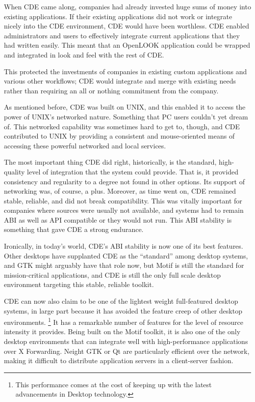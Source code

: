 When CDE came along, companies had already invested huge sums of money
into existing applications. If their existing applications did not work
or integrate nicely into the CDE environment, CDE would have been
worthless. CDE enabled administrators and users to effectively integrate
current applications that they had written easily. This meant that an
OpenLOOK application could be wrapped and integrated in look and feel
with the rest of CDE.

This protected the investments of companies in existing custom
applications and various other workflows; CDE would integrate and merge
with existing needs rather than requiring an all or nothing commitment
from the company.

As mentioned before, CDE was built on UNIX, and this enabled it to
access the power of UNIX's networked nature. Something that PC users
couldn't yet dream of. This networked capability was sometimes hard to
get to, though, and CDE contributed to UNIX by providing a consistent
and mouse-oriented means of accessing these powerful networked and local
services.


The most important thing CDE did right, historically, is the standard,
high-quality level of integration that the system could provide. That
is, it provided consistency and regularity to a degree not found in
other options. Its support of networking was, of course, a plus.
Moreover, as time went on, CDE remained stable, reliable, and did not
break compatibility. This was vitally important for companies where
sources were usually not available, and systems had to remain ABI as
well as API compatible or they would not run. This ABI stability is
something that gave CDE a strong endurance. 

Ironically, in today's world, CDE's ABI stability is now one of its best
features. Other desktops have supplanted CDE as the “standard” among
desktop systems, and GTK might arguably have that role now, but Motif is
still the standard for mission-critical applications, and CDE is still
the only full scale desktop environment targeting this stable, reliable
toolkit. 

CDE can now also claim to be one of the lightest weight full-featured
desktop systems, in large part because it has avoided the feature creep
of other desktop environments.%
\footnote{This performance comes at the cost of keeping up with the
latest advancements in Desktop technology.}
It has a remarkable number of features for the level of resource
intensity it provides. Being built on the Motif toolkit, it is also one
of the only desktop environments that can integrate well with
high-performance applications over X Forwarding. Neight GTK or Qt are
particularly efficient over the network, making it difficult to
distribute application servers in a client-server fashion. 

